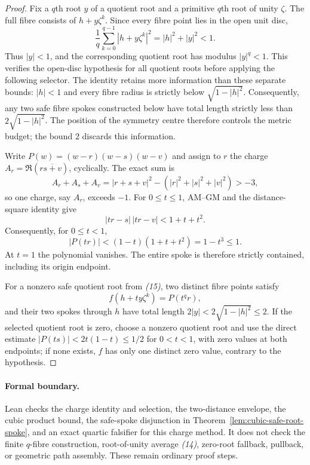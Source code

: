 \begin{proof}
Fix a $q$th root $y$ of a quotient root and a primitive $q$th root of unity
$\zeta$.  The full fibre consists of $h+y\zeta^k$.  Since every fibre point
lies in the open unit disc,
\[
 \frac1q\sum_{k=0}^{q-1}|h+y\zeta^k|^2
   =|h|^2+|y|^2<1.                                \tag{14}
\]
Thus $|y|<1$, and the corresponding quotient root has modulus
$|y|^q<1$.  This verifies the open-disc hypothesis for all quotient roots
before applying the following selector.
The identity retains more information than these separate bounds:
$|h|<1$ and every fibre radius is strictly below $\sqrt{1-|h|^2}$.
Consequently, any two safe fibre spokes constructed below have total length
strictly less than $2\sqrt{1-|h|^2}$.  The position of the symmetry centre
therefore controls the metric budget; the bound $2$ discards this information.

Write $P(w)=(w-r)(w-s)(w-v)$ and assign to $r$ the charge
$A_r=\Re(r\overline{s+v})$, cyclically.  The exact sum is
\[
 A_r+A_s+A_v=|r+s+v|^2-(|r|^2+|s|^2+|v|^2)>-3,
\]
so one charge, say $A_r$, exceeds $-1$.  For $0\le t\le1$, AM--GM and the
distance-square identity give
\[
 |tr-s|\,|tr-v|<1+t+t^2.
\]
Consequently, for $0\le t<1$,
\[
 |P(tr)|<(1-t)(1+t+t^2)=1-t^3\le1.              \tag{15}
\]
At $t=1$ the polynomial vanishes.  The entire spoke is therefore strictly
contained, including its origin endpoint.

For a nonzero safe quotient root from \emph{(15)}, two distinct
fibre points satisfy
\[
 f(h+ty\zeta^k)=P(t^qr),
\]
and their two spokes through $h$ have total length
$2|y|<2\sqrt{1-|h|^2}\le2$.  If the selected
quotient root is zero, choose a nonzero quotient root and use the direct
estimate $|P(ts)|<2t(1-t)\le1/2$ for $0<t<1$, with zero values
at both endpoints; if none exists, $f$ has only one distinct
zero value, contrary to the hypothesis.
\end{proof}

\paragraph{Formal boundary.}
\label{rem:cubic-quotient-formal-boundary}
Lean checks the charge identity and selection, the two-distance envelope,
the cubic product bound, the safe-spoke disjunction in
Theorem~\ref{lem:cubic-safe-root-spoke}, and an exact quartic falsifier for
this charge method.  It does not check the finite $q$-fibre construction,
root-of-unity average \emph{(14)}, zero-root fallback, pullback, or geometric
path assembly.  These remain ordinary proof steps.

